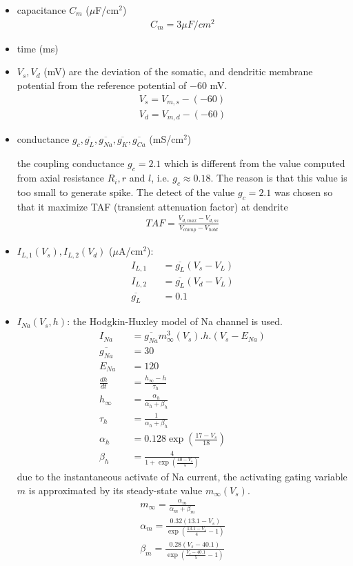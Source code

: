 \begin{itemize}
\item capacitance $C_m$ ($\mu$F/cm$^2$)
  \begin{eqnarray*}
    C_m = 3\mu F/cm^2
  \end{eqnarray*}
\item time (ms)
\item $V_s,V_d$ (mV) are the deviation of the somatic, and dendritic
  membrane potential from the reference potential of $-60$ mV. 
  \begin{eqnarray*}
    V_s = V_{m,s}-(-60) \\
    V_d = V_{m,d}-(-60)
  \end{eqnarray*}
\item conductance $g_c, \overline{g_L},\overline{g_{Na}},
  \overline{g_K},\overline{g_{Ca}}$ (mS/cm$^2$)

  the coupling conductance $g_c= 2.1$ which is different from the
  value computed from axial resistance $R_i,r$ and $l$,
  i.e. $g_c\approx 0.18$. The reason is that this value is too small
  to generate spike. The detect of the value $g_c=2.1$ was chosen so
  that it maximize  TAF (transient attenuation factor) at dendrite
  \begin{eqnarray*}
    TAF = \frac{V_{d,max}-V_{d,ss}}{V_{clamp}-V_{hold}}
  \end{eqnarray*}

\item $I_{L,1}(V_s), I_{L,2}(V_d)$ ($\mu$A/cm$^2$): 
  \begin{eqnarray*}
    I_{L,1} &&= \overline{g_L}(V_s-V_L) \\
    I_{L,2} &&= \overline{g_L}(V_d-V_L) \\
    \overline{g_L} &&= 0.1
  \end{eqnarray*}

\item $I_{Na}(V_s,h)$: the Hodgkin-Huxley model of Na channel is used.
  \begin{eqnarray*}
    I_{Na} &&=\overline{g_{Na}}m_\infty^3(V_s).h.(V_s-E_{Na}) \\
    \overline{g_{Na}} &&= 30 \\
    E_{Na} &&= 120 \\
    \frac{dh}{dt} &&= \frac{h_\infty-h}{\tau_h}\\
    h_\infty &&= \frac{\alpha_h}{\alpha_h+\beta_h} \\
    \tau_h &&=  \frac{1}{\alpha_h+\beta_h} \\
    \alpha_h &&= 0.128\exp(\frac{17-V_s}{18})\\
    \beta_h &&= \frac{4}{1+\exp(\frac{40-V_s}{5})}
  \end{eqnarray*}
due to the instantaneous activate of Na current, the activating gating
variable $m$ is approximated by its steady-state value
$m_\infty(V_s)$. 
\begin{eqnarray*}
  m_\infty = \frac{\alpha_m}{\alpha_m+\beta_m}\\
\alpha_m = \frac{0.32(13.1-V_s)}{\exp(\frac{13.1-V_s}{4}-1)}\\
\beta_m = \frac{0.28(V_s-40.1)}{\exp(\frac{V_s-40.1}{5}-1)}
\end{eqnarray*}


\end{itemize}

